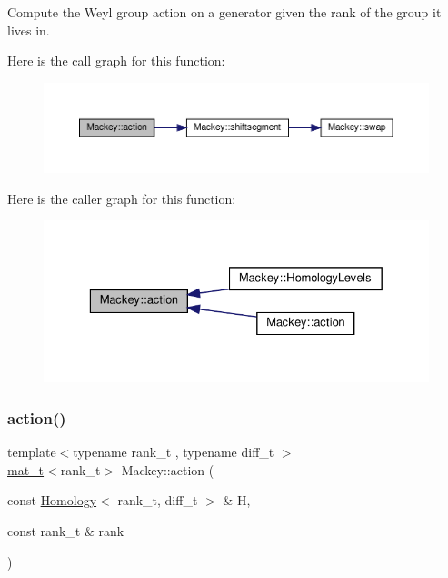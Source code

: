 Compute the Weyl group action on a generator given the rank of the group it lives in. 

Here is the call graph for this function\+:\nopagebreak
\begin{figure}[H]
\begin{center}
\leavevmode
\includegraphics[width=350pt]{namespaceMackey_aa515b26c0fbc7f19b36cee7d826f07b9_cgraph}
\end{center}
\end{figure}
Here is the caller graph for this function\+:\nopagebreak
\begin{figure}[H]
\begin{center}
\leavevmode
\includegraphics[width=329pt]{namespaceMackey_aa515b26c0fbc7f19b36cee7d826f07b9_icgraph}
\end{center}
\end{figure}
\mbox{\label{namespaceMackey_aaa66c9857ba86a13949d1b1825ea20f7}} 
\subsubsection{\texorpdfstring{action()}{action()}\hspace{0.1cm}{\footnotesize\ttfamily [2/2]}}
{\footnotesize\ttfamily template$<$typename rank\+\_\+t , typename diff\+\_\+t $>$ \\
\hyperlink{namespaceMackey_a035386035757dade630f685e508e5cf9}{mat\+\_\+t}$<$rank\+\_\+t$>$ Mackey\+::action (\begin{DoxyParamCaption}\item[{const \hyperlink{classMackey_1_1Homology}{Homology}$<$ rank\+\_\+t, diff\+\_\+t $>$ \&}]{H,  }\item[{const rank\+\_\+t \&}]{rank }\end{DoxyParamCaption})}



